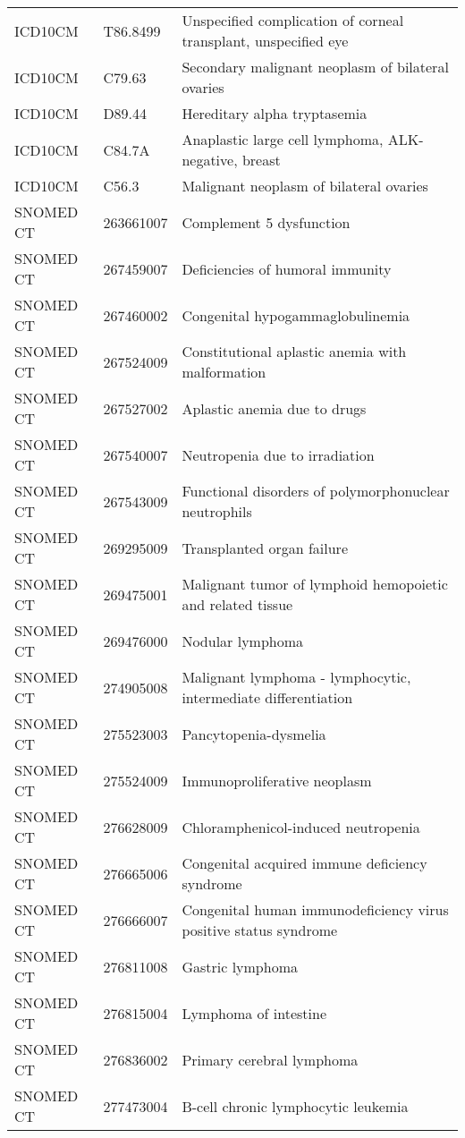 \begin{longtable}{p{}p{}p{}}
  ICD10CM & T86.8499 & Unspecified complication of corneal transplant, unspecified eye \\ 
  ICD10CM & C79.63 & Secondary malignant neoplasm of bilateral ovaries \\ 
  ICD10CM & D89.44 & Hereditary alpha tryptasemia \\ 
  ICD10CM & C84.7A & Anaplastic large cell lymphoma, ALK-negative, breast \\ 
  ICD10CM & C56.3 & Malignant neoplasm of bilateral ovaries \\ 
  SNOMED CT & 263661007 & Complement 5 dysfunction \\ 
  SNOMED CT & 267459007 & Deficiencies of humoral immunity \\ 
  SNOMED CT & 267460002 & Congenital hypogammaglobulinemia \\ 
  SNOMED CT & 267524009 & Constitutional aplastic anemia with malformation \\ 
  SNOMED CT & 267527002 & Aplastic anemia due to drugs \\ 
  SNOMED CT & 267540007 & Neutropenia due to irradiation \\ 
  SNOMED CT & 267543009 & Functional disorders of polymorphonuclear neutrophils \\ 
  SNOMED CT & 269295009 & Transplanted organ failure \\ 
  SNOMED CT & 269475001 & Malignant tumor of lymphoid hemopoietic and related tissue \\ 
  SNOMED CT & 269476000 & Nodular lymphoma \\ 
  SNOMED CT & 274905008 & Malignant lymphoma - lymphocytic, intermediate differentiation \\ 
  SNOMED CT & 275523003 & Pancytopenia-dysmelia \\ 
  SNOMED CT & 275524009 & Immunoproliferative neoplasm \\ 
  SNOMED CT & 276628009 & Chloramphenicol-induced neutropenia \\ 
  SNOMED CT & 276665006 & Congenital acquired immune deficiency syndrome \\ 
  SNOMED CT & 276666007 & Congenital human immunodeficiency virus positive status syndrome \\ 
  SNOMED CT & 276811008 & Gastric lymphoma \\ 
  SNOMED CT & 276815004 & Lymphoma of intestine \\ 
  SNOMED CT & 276836002 & Primary cerebral lymphoma \\ 
  SNOMED CT & 277473004 & B-cell chronic lymphocytic leukemia \\ 

\end{longtable}
